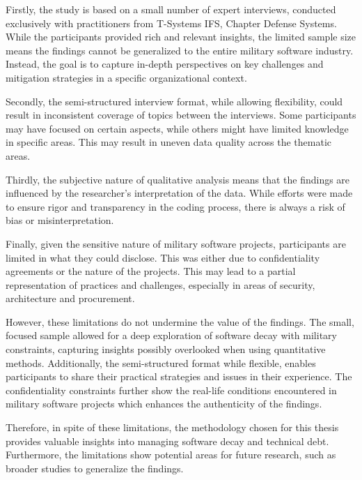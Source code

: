 Firstly, the study is based on a small number of expert interviews, conducted exclusively with practitioners from T-Systems IFS, Chapter Defense Systems. While the participants provided rich and relevant insights, the limited sample size means the findings cannot be generalized to the entire military software industry. 
Instead, the goal is to capture in-depth perspectives on key challenges and mitigation strategies in a specific organizational context.

Secondly, the semi-structured interview format, while allowing flexibility, could result in inconsistent coverage of topics between the interviews. Some participants may have focused on certain aspects, while others might have limited knowledge in specific areas. This may result in uneven data quality across the thematic areas.

Thirdly, the subjective nature of qualitative analysis means that the findings are influenced by the researcher's interpretation of the data. While efforts were made to ensure rigor and transparency in the coding process, there is always a risk of bias or misinterpretation.

Finally, given the sensitive nature of military software projects, participants are limited in what they could disclose. This was either due to confidentiality agreements or the nature of the projects. This may lead to a partial representation of practices and challenges, especially in areas of security, architecture and procurement.

However, these limitations do not undermine the value of the findings. The small, focused sample allowed for a deep exploration of software decay with military constraints, capturing insights possibly overlooked when using quantitative methods. Additionally, the semi-structured format
while flexible, enables participants to share their practical strategies and issues in their experience. The confidentiality constraints further show the real-life conditions encountered in military software projects which enhances the authenticity of the findings.

Therefore, in spite of these limitations, the methodology chosen for this thesis provides valuable insights into managing software decay and technical debt. Furthermore, the limitations show potential areas for future research, such as broader studies to generalize the findings.

